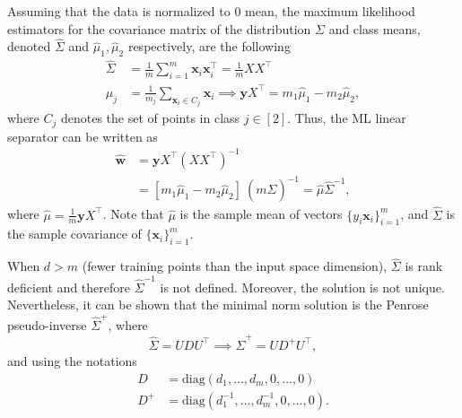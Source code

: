 \documentclass{article}
\newcommand{\bx}{\bm{x}}
\newcommand{\by}{\bm{y}}
\newcommand{\bw}{\bm{w}}
\begin{document}
Assuming that the data is normalized to $0$ mean, the maximum likelihood estimators for the covariance matrix of the distribution $\Sigma$ and class means, denoted $\hat \Sigma$ and $\hat \mu_1,\hat \mu_2$ respectively, are the following
\begin{align}
\hat \Sigma &= \frac{1}{m}\sum_{i=1}^m \bx_i \bx_i^\top = \frac{1}{m} XX^\top \label{eq:sigma-hat}\\
\hat \mu_j &= \frac{1}{m_j}\sum_{\bx_i\in C_j} \bx_i \implies {\by}X^\top=m_1 \hat\mu_1-m_2\hat\mu_2 \label{eq:mu-hat},
\end{align}
where $C_j$ denotes the set of points in class $j\in [2]$. Thus, the ML linear separator can be written as
\begin{equation*}
\begin{split}
\hat {\bw} &= {\by}X^\top (XX^\top)^{-1} \\
&= [m_1 \hat\mu_1-m_2\hat\mu_2]~(m \hat \Sigma)^{-1} = \hat\mu \hat\Sigma^{-1},
\end{split}
\end{equation*}
where $\hat \mu =  \frac{1}{m} \by X^\top$. Note that $\hat\mu$ is the sample mean of vectors $\{y_i\bx_i\}_{i=1}^m$, and $\hat\Sigma$ is the sample covariance of $\{\bx_i\}_{i=1}^m$.

When $d>m$ (fewer training points than the input space dimension), $\hat\Sigma$ is rank deficient and therefore $\hat\Sigma^{-1}$ is not defined. Moreover, the solution is not unique. Nevertheless, it can be shown that the minimal norm solution is the Penrose pseudo-inverse $\hat\Sigma^{+}$, where
\begin{equation*}
\hat\Sigma = U D U^\top \implies \hat\Sigma^{+} = U D^+ U^\top,
\end{equation*}
and using the notations
\begin{align*}
D &= \mathrm{diag}(d_1,\ldots,d_m, 0,\ldots, 0) \\
D^+ &= \mathrm{diag}(d_1^{-1},\ldots,d_m^{-1}, 0,\ldots, 0).
\end{align*}
\end{document}
